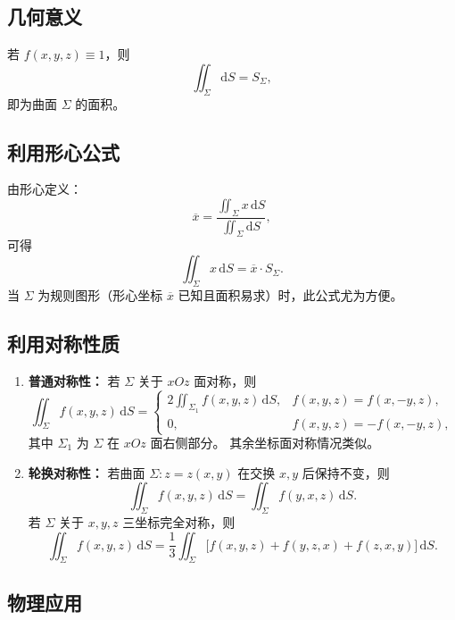 \subsection{几何意义}

若 $f(x,y,z) \equiv 1$，则
\[
      \iint_{\Sigma} \mathrm{d}S = S_{\Sigma},
\]
即为曲面 $\Sigma$ 的面积。

\subsection{利用形心公式}

由形心定义：
\[
      \overline{x} = \frac{\iint_{\Sigma} x\,\mathrm{d}S}{\iint_{\Sigma}\mathrm{d}S},
\]
可得
\[
      \iint_{\Sigma} x\,\mathrm{d}S = \overline{x} \cdot S_{\Sigma}.
\]
当 $\Sigma$ 为规则图形（形心坐标 $\overline{x}$ 已知且面积易求）时，此公式尤为方便。


\subsection{利用对称性质}

\begin{enumerate}
      \item \textbf{普通对称性：}
            若 $\Sigma$ 关于 $xOz$ 面对称，则
            \[
                  \iint_{\Sigma} f(x,y,z)\,\mathrm{d}S =
                  \begin{cases}
                        2\displaystyle\iint_{\Sigma_1} f(x,y,z)\,\mathrm{d}S, & f(x,y,z)=f(x,-y,z),  \\[6pt]
                        0,                                                    & f(x,y,z)=-f(x,-y,z),
                  \end{cases}
            \]
            其中 $\Sigma_1$ 为 $\Sigma$ 在 $xOz$ 面右侧部分。
            其余坐标面对称情况类似。

      \item \textbf{轮换对称性：}
            若曲面 $\Sigma: z=z(x,y)$ 在交换 $x,y$ 后保持不变，则
            \[
                  \iint_{\Sigma} f(x,y,z)\,\mathrm{d}S = \iint_{\Sigma} f(y,x,z)\,\mathrm{d}S.
            \]
            若 $\Sigma$ 关于 $x,y,z$ 三坐标完全对称，则
            \[
                  \iint_{\Sigma} f(x,y,z)\,\mathrm{d}S
                  = \frac{1}{3}\iint_{\Sigma}\!\big[f(x,y,z)+f(y,z,x)+f(z,x,y)\big]\,\mathrm{d}S.
            \]
\end{enumerate}


\subsection{物理应用}

